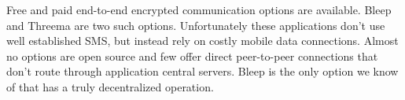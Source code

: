 Free and paid end-to-end encrypted communication options are available.
Bleep \cite{bleep} and Threema \cite{threema} are two such options.
Unfortunately these applications don’t use well established SMS, but instead rely on costly mobile data connections.
Almost no options are open source and few offer direct peer-to-peer connections that don’t route through application central servers.
Bleep is the only option we know of that has a truly decentralized operation.


